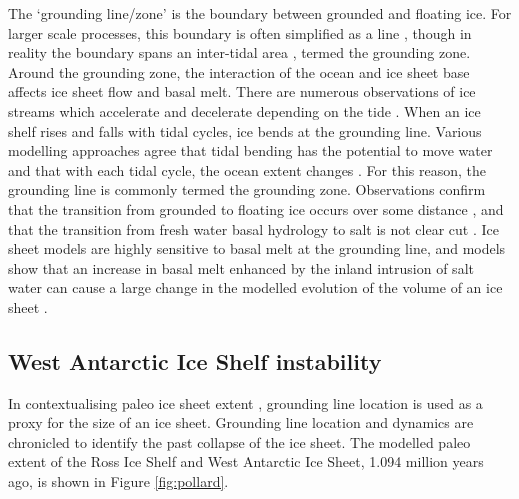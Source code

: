 The `grounding line/zone' is the boundary between grounded and floating ice. For larger scale processes, this boundary is often simplified as a line \citep[e.g][]{gudmundsson2013ice}, though in reality the boundary spans an inter-tidal area \citep[e.g][]{christianson2016basal}, termed the grounding zone. Around the grounding zone, the interaction of the ocean and ice sheet base affects ice sheet flow and basal melt.
There are numerous observations of ice streams which accelerate and decelerate depending on the tide \cite[e.g.][]{winberry2009basal,anandakrishnan2003ice}. 
When an ice shelf rises and falls with tidal cycles, ice bends at the grounding line. Various modelling approaches agree that tidal bending has the potential to move water and that with each tidal cycle, the ocean extent changes  \citep{sayag2013elastic,walker2013ice}. 
For this reason, the grounding line is commonly termed the grounding zone. Observations confirm that the transition from grounded to floating ice occurs over some distance \cite[e.g.][]{brunt2019assessment}, and that the transition from fresh water basal hydrology to salt is not clear cut \cite[e.g.][]{christianson2016basal}.
Ice sheet models are highly sensitive to basal melt at the grounding line, and models show that an increase in basal melt enhanced by the inland intrusion of salt water can cause a large change in the modelled evolution of the volume of an ice sheet \citep{robel2022layered}.


\subsection{West Antarctic Ice Shelf instability}


In contextualising paleo ice sheet extent \cite[e.g][]{naish2009obliquity,pollard2009modelling}, grounding line location is used as a proxy for the size of an ice sheet. Grounding line location and dynamics are chronicled to identify the past collapse of the ice sheet. 
The modelled paleo extent of the Ross Ice Shelf and West Antarctic Ice Sheet, 1.094 million years ago, is shown in Figure \ref{fig:pollard}.

